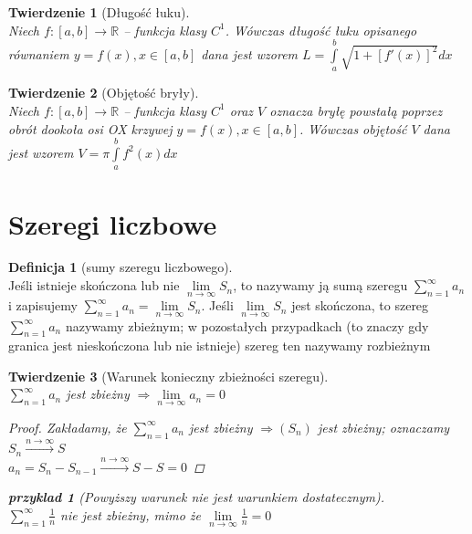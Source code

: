 \documentclass[12pt,a4paper]{article}
\newtheorem{tw}{Twierdzenie}
\newtheorem{przyklad}{przyklad}
\theoremstyle{definition}
\newtheorem{df}{Definicja}
\begin{document}
\begin{tw}[Długość łuku]~\\
Niech $f: [a,b] \to \mathbb{R}$ -- funkcja klasy $C^1$. Wówczas długość łuku opisanego równaniem $y=f(x), x\in [a,b]$ dana jest wzorem $L = \int\limits_a^b \sqrt{1 + \left[f'(x)\right]^2}dx$
\end{tw}

\begin{tw}[Objętość bryły]~\\
Niech $f: [a,b] \to \mathbb{R}$ -- funkcja klasy $C^1$ oraz $V$ oznacza bryłę powstałą poprzez obrót
 dookoła osi OX krzywej $y = f(x), x\in [a,b]$. Wówczas objętość $V$ dana jest wzorem $V = \pi\int\limits_a^b f^2(x)dx$
\end{tw}


\section{Szeregi liczbowe}

\begin{df}[sumy szeregu liczbowego]~\\
Jeśli istnieje skończona lub nie $\lim\limits_{n\to\infty}S_n$, to nazywamy ją sumą szeregu $\sum\limits_{n=1}^\infty a_n$ i zapisujemy $\sum\limits_{n=1}^\infty a_n=\lim\limits_{n\to\infty}S_n$.
Jeśli $\lim\limits_{n\to\infty}S_n$ jest skończona, to szereg $\sum\limits_{n=1}^\infty a_n$ nazywamy zbieżnym; w pozostałych przypadkach (to znaczy gdy granica jest nieskończona lub nie istnieje) szereg ten nazywamy rozbieżnym
\end{df}

\begin{tw}[Warunek konieczny zbieżności szeregu]~\\
$\sum\limits_{n=1}^\infty a_n$ jest zbieżny $\Rightarrow \lim\limits_{n\to\infty}a_n = 0$
\begin{proof}
Zakładamy, że $\sum\limits_{n=1}^\infty a_n$ jest zbieżny $\Rightarrow (S_n)$ jest zbieżny; oznaczamy 
$S_n \xrightarrow{n\to\infty} S$\\
$a_n = S_n - S_{n-1} \xrightarrow{n\to\infty} S - S = 0$ 
\end{proof}
\begin{przyklad}[Powyższy warunek nie jest warunkiem dostatecznym]~\\
$\sum\limits_{n=1}^\infty \frac{1}{n}$ nie jest zbieżny, mimo że $\lim\limits_{n\to\infty} \frac{1}{n} = 0$
\end{przyklad}
\end{tw}
\end{document}
